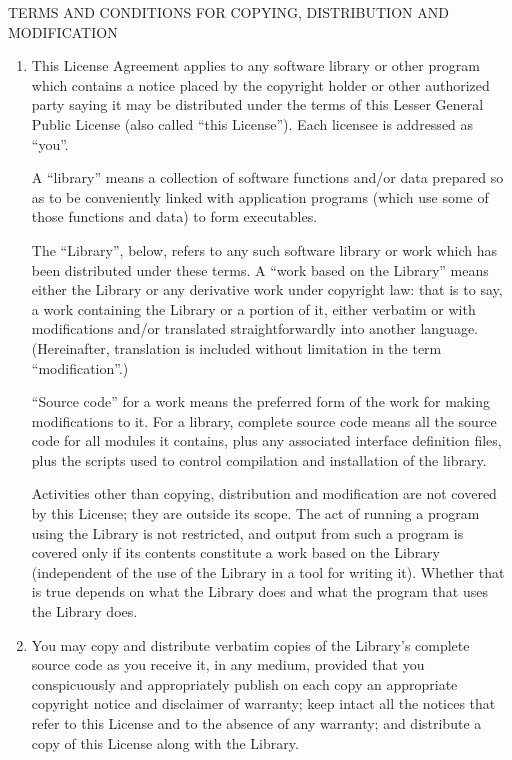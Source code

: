 \begin{center}
{\large \sc TERMS AND CONDITIONS FOR COPYING, DISTRIBUTION AND MODIFICATION}
\end{center}

\begin{enumerate}

\addtocounter{enumi}{-1}

\item This License Agreement applies to any software library or other
program which contains a notice placed by the copyright holder or
other authorized party saying it may be distributed under the terms of
this Lesser General Public License (also called ``this License'').
Each licensee is addressed as ``you''.

  A ``library'' means a collection of software functions and/or data
prepared so as to be conveniently linked with application programs
(which use some of those functions and data) to form executables.

  The ``Library'', below, refers to any such software library or work
which has been distributed under these terms.  A ``work based on the
Library'' means either the Library or any derivative work under
copyright law: that is to say, a work containing the Library or a
portion of it, either verbatim or with modifications and/or translated
straightforwardly into another language.  (Hereinafter, translation is
included without limitation in the term ``modification''.)

  ``Source code'' for a work means the preferred form of the work for
making modifications to it.  For a library, complete source code means
all the source code for all modules it contains, plus any associated
interface definition files, plus the scripts used to control compilation
and installation of the library.

  Activities other than copying, distribution and modification are not
covered by this License; they are outside its scope.  The act of
running a program using the Library is not restricted, and output from
such a program is covered only if its contents constitute a work based
on the Library (independent of the use of the Library in a tool for
writing it).  Whether that is true depends on what the Library does
and what the program that uses the Library does.
  
\item You may copy and distribute verbatim copies of the Library's
complete source code as you receive it, in any medium, provided that
you conspicuously and appropriately publish on each copy an
appropriate copyright notice and disclaimer of warranty; keep intact
all the notices that refer to this License and to the absence of any
warranty; and distribute a copy of this License along with the
Library.


\end{enumerate}
